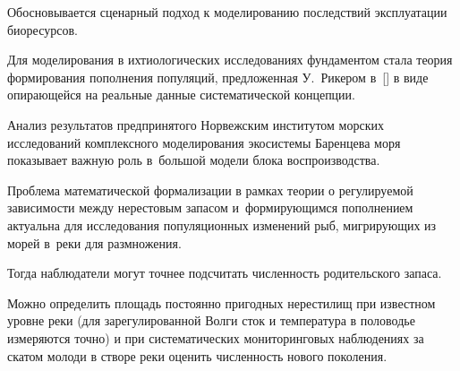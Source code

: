 Обосновывается сценарный подход к моделированию последствий эксплуатации биоресурсов.



\smallskip




Для моделирования в ихтиологических исследованиях фундаментом стала теория формирования пополнения популяций, предложенная У.~Рикером в~[] в виде опирающейся на реальные данные систематической концепции. 

Анализ результатов предпринятого Норвежским институтом морских исследований комплексного моделирования экосистемы Баренцева моря показывает важную роль в~большой модели блока воспроизводства. 




Проблема математической формализации в рамках теории о регулируемой зависимости между нерестовым запасом и~формирующимся пополнением актуальна для исследования популяционных изменений рыб, мигрирующих из морей в~реки для размножения. 

Тогда наблюдатели могут точнее подсчитать численность родительского запаса. 

Можно определить площадь постоянно пригодных нерестилищ при известном уровне реки (для зарегулированной Волги сток и температура в половодье измеряются точно) и при систематических мониторинговых наблюдениях за скатом молоди в створе реки оценить численность нового поколения. 


%




